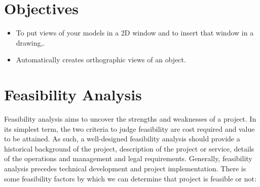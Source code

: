 \section{Objectives}
\begin{itemize}
\item To put views of your models in a 2D window and to insert that window in a drawing,.
\item Automatically creates orthographic views of an object.
\end{itemize}
\section{Feasibility Analysis}
Feasibility analysis aims to uncover the strengths and weaknesses of 
a project. In its simplest term, the two criteria to judge feasibility 
are cost required and value to be attained. As such, a well-designed 
feasibility analysis should provide a historical background of the 
project, description of the project or service, details of the 
operations and management and legal requirements. Generally, feasibility 
analysis precedes technical development and project implementation. 
There is some feasibility factors by which we can determine that 
project is feasible or not:
